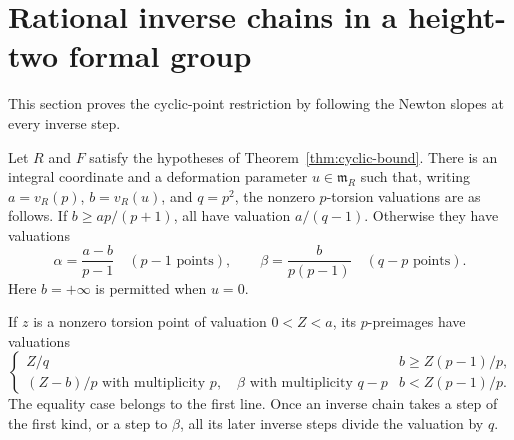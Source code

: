 \section{Rational inverse chains in a height-two formal group}\label{sec:cyclic}
This section proves the cyclic-point restriction by following the Newton slopes at every inverse step.

\begin{lemma}\label{lem:inverse-polygons}
Let $R$ and $F$ satisfy the hypotheses of Theorem~\ref{thm:cyclic-bound}. There is an integral coordinate and a deformation parameter $u\in\mathfrak m_R$ such that, writing $a=v_R(p)$, $b=v_R(u)$, and $q=p^2$, the nonzero $p$-torsion valuations are as follows. If $b\ge ap/(p+1)$, all have valuation $a/(q-1)$. Otherwise they have valuations
\begin{equation}\label{eq:alpha-beta}
 \alpha=\frac{a-b}{p-1}\quad(p-1\text{ points}),\qquad
 \beta=\frac{b}{p(p-1)}\quad(q-p\text{ points}).
\end{equation}
Here $b=+\infty$ is permitted when $u=0$.

If $z$ is a nonzero torsion point of valuation $0<Z<a$, its $p$-preimages have valuations
\begin{equation}\label{eq:inverse-polygons}
 \begin{cases}
 Z/q & b\ge Z(p-1)/p,\\[2pt]
 (Z-b)/p\text{ with multiplicity }p,
 \quad\beta\text{ with multiplicity }q-p
 & b<Z(p-1)/p.
 \end{cases}
\end{equation}
The equality case belongs to the first line. Once an inverse chain takes a step of the first kind, or a step to $\beta$, all its later inverse steps divide the valuation by $q$.
\end{lemma}

